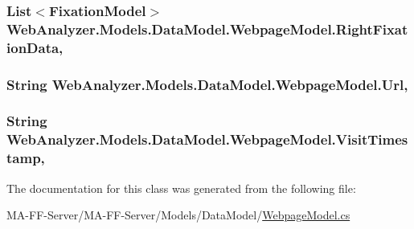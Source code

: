\subsubsection[{Right\+Fixation\+Data}]{\setlength{\rightskip}{0pt plus 5cm}List$<${\bf Fixation\+Model}$>$ Web\+Analyzer.\+Models.\+Data\+Model.\+Webpage\+Model.\+Right\+Fixation\+Data\hspace{0.3cm}{\ttfamily [get]}, {\ttfamily [set]}}\label{class_web_analyzer_1_1_models_1_1_data_model_1_1_webpage_model_abe8cc7ad2f30655dbd1ba0c1111429d6}
\hypertarget{class_web_analyzer_1_1_models_1_1_data_model_1_1_webpage_model_a956b067ed12f422f646b7e2a4b6bb42d}{}
\subsubsection[{Url}]{\setlength{\rightskip}{0pt plus 5cm}String Web\+Analyzer.\+Models.\+Data\+Model.\+Webpage\+Model.\+Url\hspace{0.3cm}{\ttfamily [get]}, {\ttfamily [set]}}\label{class_web_analyzer_1_1_models_1_1_data_model_1_1_webpage_model_a956b067ed12f422f646b7e2a4b6bb42d}
\hypertarget{class_web_analyzer_1_1_models_1_1_data_model_1_1_webpage_model_ac3378fdc78273706547ec3a9d377ef9a}{}
\subsubsection[{Visit\+Timestamp}]{\setlength{\rightskip}{0pt plus 5cm}String Web\+Analyzer.\+Models.\+Data\+Model.\+Webpage\+Model.\+Visit\+Timestamp\hspace{0.3cm}{\ttfamily [get]}, {\ttfamily [set]}}\label{class_web_analyzer_1_1_models_1_1_data_model_1_1_webpage_model_ac3378fdc78273706547ec3a9d377ef9a}


The documentation for this class was generated from the following file\+:\begin{DoxyCompactItemize}
\item 
M\+A-\/\+F\+F-\/\+Server/\+M\+A-\/\+F\+F-\/\+Server/\+Models/\+Data\+Model/\hyperlink{_webpage_model_8cs}{Webpage\+Model.\+cs}\end{DoxyCompactItemize}
